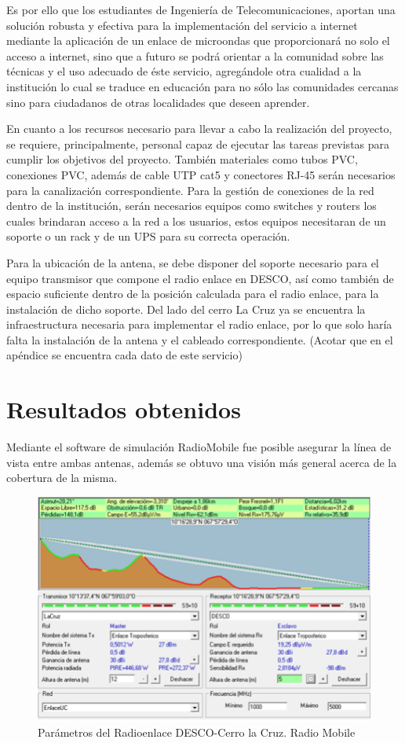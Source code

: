 \documentclass[11pt, a4paper, twosides]{report}
\begin{document}
Es por ello que los estudiantes de Ingeniería de Telecomunicaciones, aportan una solución robusta y efectiva para la implementación del servicio a internet mediante la aplicación de un enlace de microondas que proporcionará no solo el acceso a internet, sino que a futuro se podrá orientar a la comunidad sobre las técnicas y el uso adecuado de éste servicio, agregándole otra cualidad a la institución lo cual se traduce en educación para no sólo las comunidades cercanas sino para ciudadanos de otras localidades que deseen aprender.

En cuanto a los recursos necesario para llevar a cabo la realización del proyecto, se requiere, principalmente, personal capaz de ejecutar las tareas previstas para cumplir los objetivos del proyecto. También materiales como tubos PVC, conexiones PVC, además de cable UTP cat5 y conectores RJ-45 serán necesarios para la canalización correspondiente. Para la gestión de conexiones de la red dentro de la institución, serán necesarios equipos como switches y routers los cuales brindaran acceso a la red a los usuarios, estos equipos necesitaran de un soporte o un rack y de un UPS para su correcta operación.

Para la ubicación de la antena, se debe disponer del soporte necesario para el equipo transmisor que compone el radio enlace en DESCO, así como también de espacio suficiente dentro de la posición calculada para el radio enlace, para la instalación de dicho soporte.
Del lado del cerro La Cruz ya se encuentra la infraestructura necesaria para implementar el radio enlace, por lo que solo haría falta la instalación de la antena y el cableado correspondiente.
(Acotar que en el apéndice se encuentra cada dato de este servicio)


\chapter{Resultados obtenidos}
Mediante el software de simulación RadioMobile fue posible asegurar la línea de vista entre ambas antenas, además se obtuvo una visión más general acerca de la cobertura de la misma.

\begin{figure}[h]
    \centering
    \includegraphics[width=0.55\linewidth]{rm.png}
    \caption{Parámetros del Radioenlace DESCO-Cerro la Cruz. Radio Mobile}
    \label{fig:rm}
\end{figure}
\end{document}
